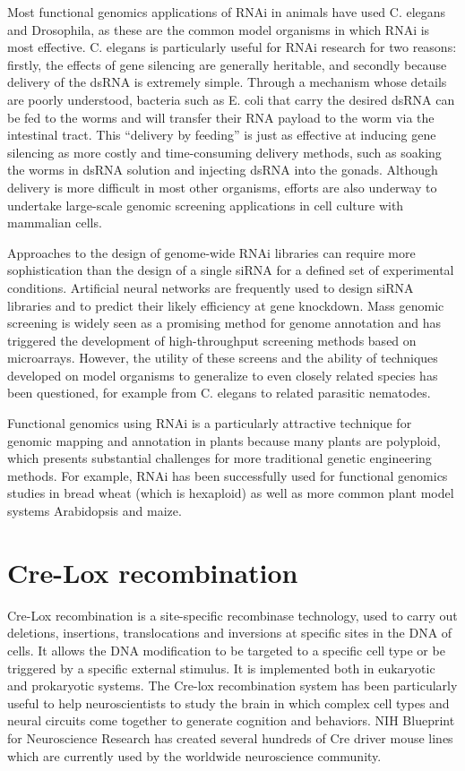 Most functional genomics applications of RNAi in animals have used C. elegans and Drosophila, as these are the common model organisms in which RNAi is most effective. C. elegans is particularly useful for RNAi research for two reasons: firstly, the effects of gene silencing are generally heritable, and secondly because delivery of the dsRNA is extremely simple. Through a mechanism whose details are poorly understood, bacteria such as E. coli that carry the desired dsRNA can be fed to the worms and will transfer their RNA payload to the worm via the intestinal tract. This ``delivery by feeding'' is just as effective at inducing gene silencing as more costly and time-consuming delivery methods, such as soaking the worms in dsRNA solution and injecting dsRNA into the gonads. Although delivery is more difficult in most other organisms, efforts are also underway to undertake large-scale genomic screening applications in cell culture with mammalian cells.

Approaches to the design of genome-wide RNAi libraries can require more sophistication than the design of a single siRNA for a defined set of experimental conditions. Artificial neural networks are frequently used to design siRNA libraries and to predict their likely efficiency at gene knockdown. Mass genomic screening is widely seen as a promising method for genome annotation and has triggered the development of high-throughput screening methods based on microarrays. However, the utility of these screens and the ability of techniques developed on model organisms to generalize to even closely related species has been questioned, for example from C. elegans to related parasitic nematodes.

Functional genomics using RNAi is a particularly attractive technique for genomic mapping and annotation in plants because many plants are polyploid, which presents substantial challenges for more traditional genetic engineering methods. For example, RNAi has been successfully used for functional genomics studies in bread wheat (which is hexaploid) as well as more common plant model systems Arabidopsis and maize.

\hypertarget{cre-lox-recombination}{%
\section{Cre-Lox recombination}\label{cre-lox-recombination}}

Cre-Lox recombination is a site-specific recombinase technology, used to carry out deletions, insertions, translocations and inversions at specific sites in the DNA of cells. It allows the DNA modification to be targeted to a specific cell type or be triggered by a specific external stimulus. It is implemented both in eukaryotic and prokaryotic systems. The Cre-lox recombination system has been particularly useful to help neuroscientists to study the brain in which complex cell types and neural circuits come together to generate cognition and behaviors. NIH Blueprint for Neuroscience Research has created several hundreds of Cre driver mouse lines which are currently used by the worldwide neuroscience community.

